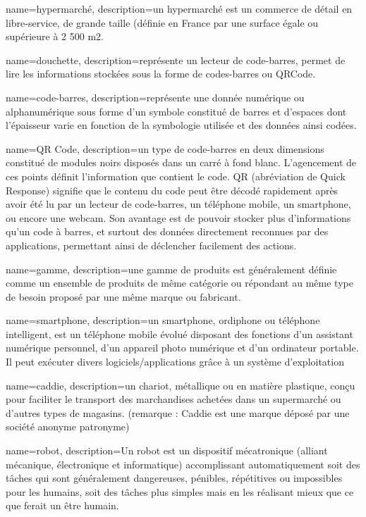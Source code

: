 \makeglossaries
\thispagestyle{glossary}

 {
    name=hypermarché,
    description={un hypermarché est un commerce de détail en libre-service, de grande taille (définie en France par une surface égale ou supérieure à 2 500 m2.}
}

 {
	name=douchette,
	description={représente un lecteur de code-barres, permet de lire les informations stockées sous la forme de codes-barres ou QRCode.}
}

 {
	name=code-barres,
	description={représente une donnée numérique ou alphanumérique sous forme d'un symbole constitué de barres et d'espaces dont l'épaisseur varie en fonction de la symbologie utilisée et des données ainsi codées.}
}

 {
	name=QR Code,
	description={un type de code-barres en deux dimensions constitué de modules noirs disposés dans un carré à fond blanc. L'agencement de ces points définit l'information que contient le code. QR (abréviation de Quick Response) signifie que le contenu du code peut être décodé rapidement après avoir été lu par un lecteur de code-barres, un téléphone mobile, un smartphone, ou encore une webcam. Son avantage est de pouvoir stocker plus d'informations qu'un code à barres, et surtout des données directement reconnues par des applications, permettant ainsi de déclencher facilement des actions.}
}

 {
	name=gamme,
	description={une gamme de produits est généralement définie comme un ensemble de produits de même catégorie ou répondant au même type de besoin proposé par une même marque ou fabricant.}
}

 {
	name=smartphone,
	description={un smartphone, ordiphone ou téléphone intelligent, est un téléphone mobile évolué disposant des fonctions d'un assistant numérique personnel, d'un appareil photo numérique et d'un ordinateur portable. Il peut exécuter divers logiciels/applications grâce à un système d'exploitation}
}

 {
	name=caddie,
	description={un chariot, métallique ou en matière plastique, conçu pour faciliter le transport des marchandises achetées dans un supermarché ou d'autres types de magasins. (remarque : Caddie est une marque déposé par une société anonyme patronyme)}
}

 {
	name=robot,
	description={Un robot est un dispositif mécatronique (alliant mécanique, électronique et informatique) accomplissant automatiquement soit des tâches qui sont généralement dangereuses, pénibles, répétitives ou impossibles pour les humains, soit des tâches plus simples mais en les réalisant mieux que ce que ferait un être humain.}
}

